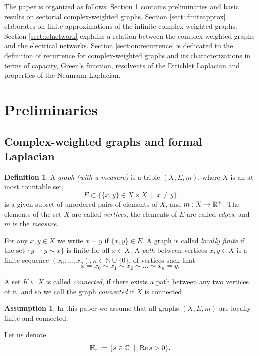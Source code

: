 \documentclass[a4paper,11pt]{amsart}
\theoremstyle{definition}
\newtheorem{definition}[theorem]{Definition}
\newtheorem{assumption}[theorem]{Assumption}
\renewcommand{\Re}{\operatorname{Re}}%
\newcommand{\cfreq}{s}
\begin{document}
The paper is organized as follows. Section \ref{sect::preliminaries} contains preliminaries and basic results on sectorial complex-weighted graphs. Section \ref{sect::finiteapprox} elaborates on finite approximations of the infinite complex-weighted graphs. Section \ref{sect::elnetwork} explains a relation between the complex-weighted graphs and the electrical networks. Section \ref{section:recurrence} is dedicated to the definition of recurrence for complex-weighted graphs and its characterizations in terms of capacity, Green's function, resolvents of the Dirichlet Laplacian and properties of the Neumann Laplacian. 



\section{Preliminaries}
\label{sect::preliminaries}
\subsection{Complex-weighted graphs and formal Laplacian}

\begin{definition}\label{def::graph}
A {\em graph (with a measure)} is a triple $(X,E,m)$, where $X$ is an at most countable set, 
$$
E
 \subset \{\{x,y\}\in X\times X\;\mid\;x\ne y\}
 $$ 
 is a given subset of unordered pairs of elements of $X$, and $m:X\to\Bbb R^+$. The elements of the set $X$ are called {\em vertices}, the elements of $E$ are called {\em edges}, and $m$ is the {\em measure}.
\end{definition}

For any $x,y\in X$ we write $x\sim y$ if $\{x,y\}\in E$. A graph is called {\em locally finite} if the set
$
\{y\;\mid\;y\sim x\}
$ is finite for all $x\in X$.  A {\em path} between  vertices $x,y\in X$ is a finite sequence $(x_0,\ldots,x_{n}), n\in \mathbb N\cup\{0\}$,  of vertices such that
$$
x=x_0\sim x_1\sim x_2\sim \dots \sim x_n=y.
$$

A set $ K\subseteq X $ is called {\em connected}, if there exists a path between any two vertices of it, and so we call  the graph \emph{connected} if $ X $ is connected.


\begin{assumption}\label{a:graph}  In this paper we assume that all graphs $ (X,E,m) $ are locally finite and connected.
\end{assumption}


Let us denote
$$
\Bbb H_r:=\{\cfreq \in \Bbb C\;\mid\;\Re \cfreq>0\}.
$$
\end{document}
